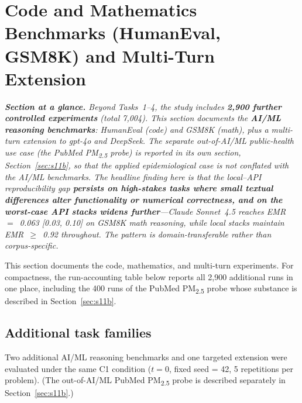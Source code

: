 \documentclass[11pt]{article}
\begin{document}
\section{Code and Mathematics Benchmarks (HumanEval, GSM8K) and Multi-Turn Extension}\label{sec:s11}

\textit{\textbf{Section at a glance.} Beyond Tasks~1--4, the study includes \textbf{2{,}900 further controlled experiments} (total 7{,}004). This section documents the \textbf{AI/ML reasoning benchmarks}: HumanEval (code) and GSM8K (math), plus a multi-turn extension to gpt-4o and DeepSeek. The separate out-of-AI/ML public-health use case (the PubMed PM\textsubscript{2.5} probe) is reported in its own section, Section~\ref{sec:s11b}, so that the applied epidemiological case is not conflated with the AI/ML benchmarks. The headline finding here is that the local--API reproducibility gap \textbf{persists on high-stakes tasks where small textual differences alter functionality or numerical correctness, and on the worst-case API stacks widens further}---Claude Sonnet~4.5 reaches EMR~$=$~0.063 [0.03, 0.10] on GSM8K math reasoning, while local stacks maintain EMR~$\geq$~0.92 throughout. The pattern is domain-transferable rather than corpus-specific.}

This section documents the code, mathematics, and multi-turn experiments. For compactness, the run-accounting table below reports all 2{,}900 additional runs in one place, including the 400 runs of the PubMed PM\textsubscript{2.5} probe whose substance is described in Section~\ref{sec:s11b}.

\subsection{Additional task families}

Two additional AI/ML reasoning benchmarks and one targeted extension were evaluated under the same C1 condition ($t{=}0$, fixed seed = 42, 5 repetitions per problem). (The out-of-AI/ML PubMed PM\textsubscript{2.5} probe is described separately in Section~\ref{sec:s11b}.)
\end{document}
